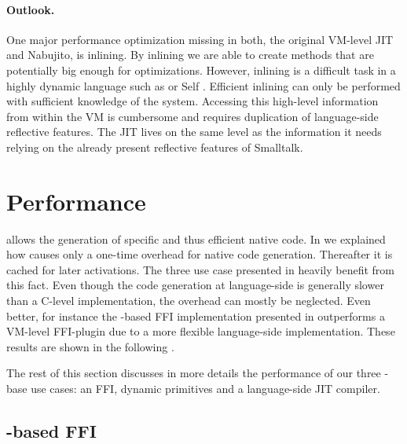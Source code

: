 \paragraph{Outlook.}
One major performance optimization missing in both, the original \PH VM-level JIT and Nabujito, is inlining. 
By inlining we are able to create methods that are potentially big enough for optimizations.
However, inlining is a difficult task in a highly dynamic language such as \ST or Self \cite{Cham89a}. 
Efficient inlining can only be performed with sufficient knowledge of the system. 
Accessing this high-level information from within the VM is cumbersome and requires duplication of language-side reflective features.
The JIT lives on the same level as the information it needs relying on the already present reflective features of Smalltalk.


\section{Performance}
\B allows the generation of specific and thus efficient native code.
In  we explained how \B causes only a one-time overhead for native code generation. 
Thereafter it is cached for later activations.
The three use case presented in  heavily benefit from this fact.
Even though the code generation at language-side is generally slower than a C-level implementation, the overhead can mostly be neglected.
Even better, for instance the \B-based FFI implementation presented in  outperforms a VM-level FFI-plugin due to a more flexible language-side implementation. 
These results are shown in the following .

The rest of this section discusses in more details the performance of our three \B-base use cases: an FFI, dynamic primitives and a language-side JIT compiler.

\subsection{\B-based FFI}

